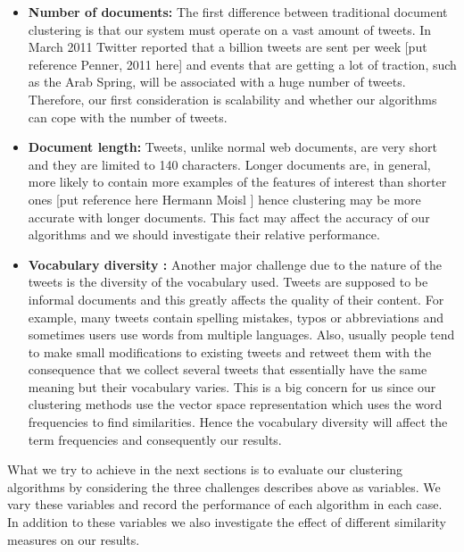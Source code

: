 \begin{itemize}
   \item \textbf{Number of documents:} The first difference between traditional document clustering is that our system must operate on a vast amount 
   of tweets. In March 2011 Twitter reported that a billion tweets are sent per week [put reference Penner, 2011 here] and events that are getting a lot 
   of traction, such as the Arab Spring, will be associated with a huge number of tweets. Therefore, our first consideration is scalability and whether our algorithms can cope with the 
   number of tweets.    
   \item \textbf{Document length:} Tweets, unlike normal web documents, are very short and they are limited to 140 characters. Longer documents are, in general, more likely
  to contain more examples of the features of interest than shorter ones [put reference here Hermann Moisl ] hence clustering may be more accurate with longer documents. This fact may 
  affect the accuracy of our algorithms and we should investigate their relative performance. 
   \item \textbf{Vocabulary diversity :} Another major challenge due to the nature of the tweets is the diversity of the vocabulary used. Tweets are supposed to be informal documents
   and this greatly affects the quality of their content. For example, many tweets contain spelling mistakes, typos or abbreviations and sometimes users use words from multiple languages.
   Also, usually people tend to make small modifications to existing tweets and retweet them with the consequence that we collect several tweets that essentially have the same meaning but their
   vocabulary varies. This is a big concern for us since our clustering methods use the vector space representation which uses the word frequencies to find similarities. Hence the vocabulary 
   diversity will affect the term frequencies and consequently our results. 
\end{itemize} 
What we try to achieve in the next sections is to evaluate our clustering algorithms by considering the three challenges describes above as variables. We vary these variables and 
record the performance of each algorithm in each case. In addition to these variables we also investigate the effect of different similarity measures on our results. 

   
